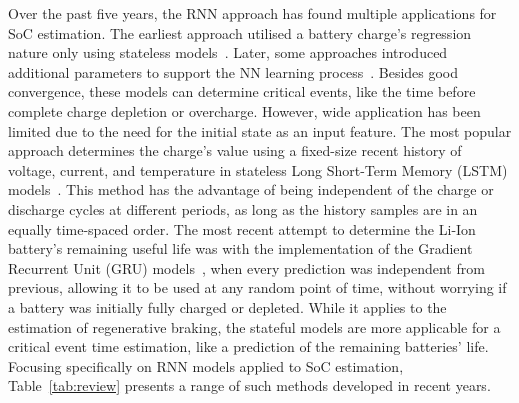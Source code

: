 % 
Over the past five years, the RNN approach has found multiple applications for SoC estimation.
The earliest approach utilised a battery charge's regression nature only using stateless models~\cite{song_lithium-ion_2018,jiao_gru-rnn_2020,xiao_accurate_2019}.
Later, some approaches introduced additional parameters to support the NN learning process~\cite{mamo_long_2020,jiao_gru-rnn_2020,javid_adaptive_2020}.
Besides good convergence, these models can determine critical events, like the time before complete charge depletion or overcharge.
However, wide application has been limited due to the need for the initial state as an input feature.
The most popular approach determines the charge's value using a fixed-size recent history of voltage, current, and temperature in stateless Long Short-Term Memory (LSTM) models~\cite{Chemali2017,mamo_long_2020,javid_adaptive_2020,zhang_deep_2020}.
This method has the advantage of being independent of the charge or discharge cycles at different periods, as long as the history samples are in an equally time-spaced order.
The most recent attempt to determine the Li-Ion battery's remaining useful life was with the implementation of the Gradient Recurrent Unit (GRU) models~\cite{song_lithium-ion_2018,javid_adaptive_2020,xiao_accurate_2019,jiao_gru-rnn_2020}, when every prediction was independent from previous, allowing it to be used at any random point of time, without worrying if a battery was initially fully charged or depleted.
While it applies to the estimation of regenerative braking, the stateful models are more applicable for a critical event time estimation, like a prediction of the remaining batteries' life.
Focusing specifically on RNN models applied to SoC estimation, \mbox{Table~\ref{tab:review}} presents a range of such methods developed in recent years.

